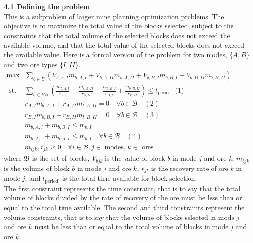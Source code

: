 \documentclass[11pt]{article}
\begin{document}
\noindent \textbf{4.1 Defining the problem}
\\

\noindent This is a subproblem of larger mine planning optimization problems. The objective is to maximize the total value of the blocks selected, subject to the constraints that the total volume of the selected blocks does not exceed the available volume, and that the total value of the selected blocks does not exceed the available value. Here is a formal version of the problem for two modes, $\{A, B\}$ and two ore types $\{I, II\}$.
\\

$
\begin{aligned} 
    \max & \sum_{b \in B}\left(V_{b, A, I} m_{b, A, I}+V_{b, A, II} m_{b, A, II}+V_{b, B, I} m_{b, B, I}+V_{b, B, II} m_{b, B, II}\right) \\ 
    \text { st. } & \sum_{b \in B B}\left(\frac{m_{b, A, I}}{r_{A, I}}+\frac{m_{b, A, II}}{r_{A, II}}+\frac{m_{b, B, I}}{r_{B, I}}+\frac{m_{b, B, II}}{r_{B, II}}\right) \leqslant t_{\text {period }} \text { (1) } \\
    & r_{A,I} m_{b, A, I} + r_{A,II} m_{b, A, II} =0 \quad \forall b \in \mathcal{B} \quad(2) \\
    & r_{B,I} m_{b, B, I} + r_{B,II} m_{b, B, II} =0 \quad \forall b \in \mathcal{B} \quad(3) \\
    & m_{b, A, I}+m_{b, B, I} \leqslant m_{b, I}  \\ 
    & m_{b, A, I}+m_{b, B, I} \leqslant m_{b, I}  \quad \forall b \in \mathcal{B} \quad(4) \\ 
    & m_{i j k}, r_{j k} \geqslant 0 \quad \forall i \in \mathcal{B}, j \in \text { modes, } k \in \text { ores }
\end{aligned}
$
\\

\noindent where $\mathfrak{B}$ is the set of blocks, $V_{b j k}$ is the value of block $b$ in mode $j$ and ore $k$, $m_{b j k}$ is the volume of block $b$ in mode $j$ and ore $k$, $r_{j k}$ is the recovery rate of ore $k$ in mode $j$, and $t_{\text {period }}$ is the total time available for block selection.\\

\noindent The first constraint represents the time constraint, that is to say that the total volume of blocks divided by the rate of recovery of the ore must be less than or equal to the total time available. The second and third constraints represent the volume constraints, that is to say that the volume of blocks selected in mode $j$ and ore $k$ must be less than or equal to the total volume of blocks in mode $j$ and ore $k$.\\
\end{document}
